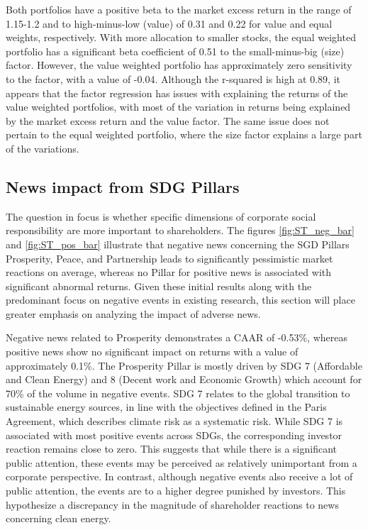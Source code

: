 Both portfolios have a positive beta to the market excess return in the range of 1.15-1.2 and to high-minus-low (value) of 0.31 and 0.22 for value and equal weights, respectively. With more allocation to smaller stocks, the equal weighted portfolio has a significant beta coefficient of 0.51 to the small-minus-big (size) factor. However, the value weighted portfolio has approximately zero sensitivity to the factor, with a value of -0.04. Although the r-squared is high at 0.89, it appears that the factor regression has issues with explaining the returns of the value weighted portfolios, with most of the variation in returns being explained by the market excess return and the value factor. The same issue does not pertain to the equal weighted portfolio, where the size factor explains a large part of the variations. 






\subsection{News impact from SDG Pillars} \label{sec: short_term_analysis_SDG}

The question in focus is whether specific dimensions of corporate social responsibility are more important to shareholders. The figures \ref{fig:ST_neg_bar} and \ref{fig:ST_pos_bar} illustrate that negative news concerning the SGD Pillars Prosperity, Peace, and Partnership leads to significantly pessimistic market reactions on average, whereas no Pillar for positive news is associated with significant abnormal returns. Given these initial results along with the predominant focus on negative events in existing research, this section will place greater emphasis on analyzing the impact of adverse news. 

Negative news related to Prosperity demonstrates a CAAR of -0.53\%, whereas positive news show no significant impact on returns with a value of approximately 0.1\%. The Prosperity Pillar is mostly driven by SDG 7 (Affordable and Clean Energy) and 8 (Decent work and Economic Growth) which account for 70\% of the volume in negative events. SDG 7 relates to the global transition to sustainable energy sources, in line with the objectives defined in the Paris Agreement, which describes climate risk as a systematic risk. While SDG 7 is associated with most positive events across SDGs, the corresponding investor reaction remains close to zero. This suggests that while there is a significant public attention, these events may be perceived as relatively unimportant from a corporate perspective. In contrast, although negative events also receive a lot of public attention, the events are to a higher degree punished by investors. This hypothesize a discrepancy in the magnitude of shareholder reactions to news concerning clean energy. 

